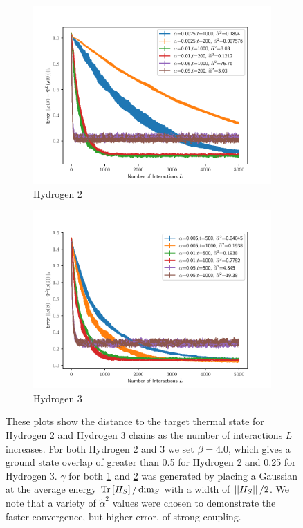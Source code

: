\begin{figure}
\centering
    \centering
    \begin{subfigure}{0.49\textwidth}
        \includegraphics[width = \textwidth]{tsp_numerics/data/error_vs_interaction_h2_chain_1.pdf}    
        \caption{Hydrogen 2 }\label{fig:h2_error}
    \end{subfigure}    
    \begin{subfigure}{0.49\textwidth}
        \includegraphics[width=\textwidth]{tsp_numerics/data/error_vs_interaction_h3_chain_3.pdf}
        \caption{Hydrogen 3 }\label{fig:h3_error}
    \end{subfigure} 
    \caption{These plots show the distance to the target thermal state for Hydrogen 2 and Hydrogen 3 chains as the number of interactions $L$ increases. For both Hydrogen 2 and 3 we set $\beta = 4.0$, which gives a ground state overlap of greater than 0.5 for Hydrogen 2 and 0.25 for Hydrogen 3. $\gamma$ for both \ref{fig:h2_error} and \ref{fig:h3_error} was generated by placing a Gaussian at the average energy $\operatorname{Tr} \left[  H_S  \right] / \dim_S$ with a width of $\left| \left| H_S \right| \right| / 2$. We note that a variety of $\widetilde{\alpha}^2$ values were chosen to demonstrate the faster convergence, but higher error, of strong coupling.
    }
    \label{fig:h_chain_error}
\end{figure}

